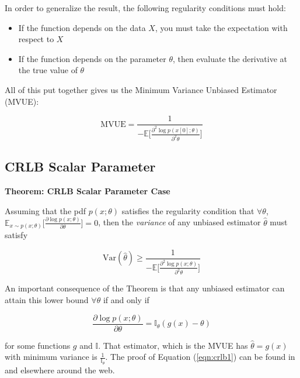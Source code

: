 \documentclass{article}
\theoremstyle{definition}
\begin{document}
In order to generalize the result, the following regularity
conditions must hold: 

\begin{itemize}
\item If the function depends on the data $X$, you must take the
expectation with respect to $X$ 
\item If the function depends on the parameter $\theta$, then
evaluate the derivative at the true value of $\theta$
\end{itemize}

\bigskip
\noindent
All of this put together gives us the Minimum Variance Unbiased
Estimator (MVUE): 
 
\begin{equation*}
\text{MVUE} = \frac{1}{- \mathbb{E} \Big [\frac{\partial^2 \log
p(x[0]; \theta)}{\partial^2 \theta} \Big ] } 
\end{equation*}


\subsection{CRLB Scalar Parameter}

\textbf{Theorem:  CRLB Scalar Parameter Case} 

\bigskip
\noindent
Assuming that the pdf $p(x;\theta)$ satisfies the regularity
condition that $\forall \theta$, \\ $\mathbb{E}_{x \sim
p(x;\theta)} \Big [ \frac{\partial \log p(x; \theta)}{\partial
\theta} \Big ] = 0$, then the \emph{variance} of any unbiased
estimator $\widehat{\theta}$ must satisfy

\medskip
\begin{equation*}
\text{Var}(\widehat{\theta}) \geqslant \frac{1}{- \mathbb{E} \Big
[\frac{\partial^2 \log p(x; \theta)}{\partial^2 \theta} \Big ]} 
\end{equation*}

\bigskip
\noindent
An important consequence of the Theorem is that any unbiased
estimator can attain this lower bound $\forall \theta$ if and
only if

\begin{equation}
\label{eqn:crlb1}
\frac{\partial \log p(x;\theta)}{\partial \theta} = \mathbb{I}_{\theta}(g(x) - \theta)
\end{equation}

\bigskip
\noindent
for some functions $g$ and $\mathbb{I}$. That estimator, which is
the MVUE has $\widehat{\theta} = g(x)$ with minimum variance is
$\frac{1}{\mathbb{I}_\theta}$. The proof of Equation
(\ref{eqn:crlb1}) can be found in \cite{Kay:1993:FSS:151045} and
elsewhere around the web.
\end{document}
